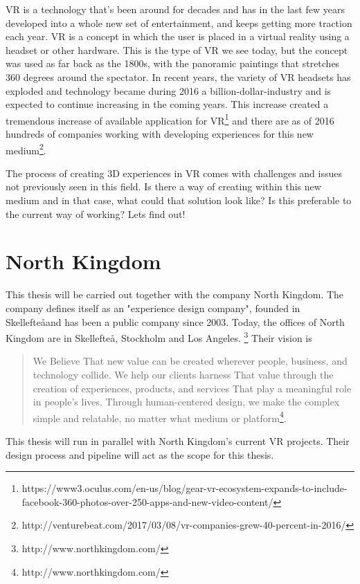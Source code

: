 VR is a technology that's been around for decades and has in the last few years developed into a whole new set of entertainment, and keeps getting more traction each year\cite{VR:mazuryk1996virtual}. VR is a concept in which the user is placed in a virtual reality using a headset or other hardware. This is the type of VR we see today, but the concept was used  as far back as the 1800s, with the panoramic paintings that stretches 360 degrees around the spectator. In recent years, the variety of VR headsets has exploded and technology became during 2016 a billion-dollar-industry and is expected to continue increasing in the coming years\cite{VR_stats:statista}.
This increase created a tremendous increase of available application for VR\footnote{https://www3.oculus.com/en-us/blog/gear-vr-ecosystem-expands-to-include-facebook-360-photos-over-250-apps-and-new-video-content/} and there are as of 2016 hundreds of companies working with developing experiences for this new medium\footnote{http://venturebeat.com/2017/03/08/vr-companies-grew-40-percent-in-2016/}.

The process of creating 3D experiences in VR comes with challenges and issues not previously seen in this field. Is there a way of creating within this new medium and in that case, what could that solution look like? Is this preferable to the current way of working? Lets find out!

\section{North Kingdom}
This thesis will be carried out together with the company North Kingdom. The company defines itself as an "experience design company", founded in Skellefte\aa and has been a public company since 2003. Today, the offices of North Kingdom are in Skellefte\aa, Stockholm and Los Angeles. \footnote{http://www.northkingdom.com/} Their vision is
\begin{quote}
We Believe That new value can be created wherever people, business, and technology collide. We help our clients harness That value through the creation of experiences, products, and services That play a meaningful role in people's lives. Through human-centered design, we make the complex simple and relatable, no matter what medium or platform\footnote{http://www.northkingdom.com/}.
\end{quote}
This thesis will run in parallel with North Kingdom's current VR projects. Their design process and pipeline will act as the scope for this thesis.

